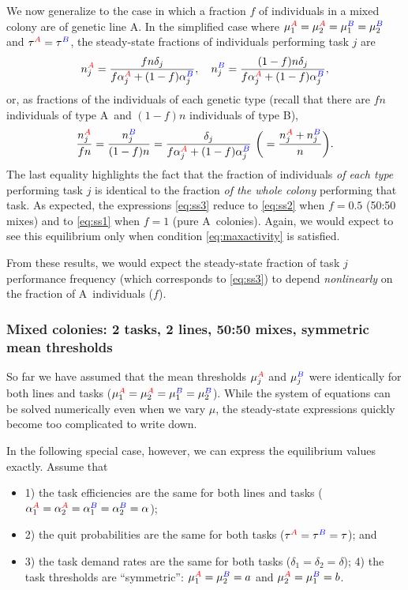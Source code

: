 \documentclass[11pt]{article}
\newcommand{\A}{{\color{red}A}}
\newcommand{\B}{{\color{blue}B}}
\begin{document}
\begin{appendices}
We now generalize to the case in which a fraction $f$ of individuals in a mixed colony are of genetic line \A. In the simplified case where $\mu_1^{\A} = \mu_2^{\A} = \mu_1^{\B} = \mu_2^{\B}$ and $\tau^{\A} = \tau^{\B}$, the steady-state fractions of individuals performing task $j$ are
\begin{equation}
     n_j^{\A} =  \frac{fn\delta_j}{f\alpha_j^{\A} + (1-f)\alpha_j^{\B}}, 
     \quad
     n_j^{\B} =  \frac{(1-f)n\delta_j}{f\alpha_j^{\A} + (1-f)\alpha_j^{\B}}, 
     \label{eq:ss3a}
\end{equation}
or, as fractions of the individuals of each genetic type (recall that there are $fn$ individuals of type \A\ and $(1-f)n$ individuals of type \B),
\begin{equation}
     \frac{n_j^{\A}}{fn} =  \frac{n_j^{\B}}{(1-f)n} = \frac{\delta_j}{f\alpha_j^{\A} + (1-f)\alpha_j^{\B}} \ \bigg(= \frac{n_j^{\A} + n_j^{\B}}{n}\bigg). \label{eq:ss3}
\end{equation}
The last equality highlights the fact that the fraction of individuals \textit{of each type} performing task $j$ is identical to the fraction \textit{of the whole colony} performing that task. As expected, the expressions \eqref{eq:ss3} reduce to \eqref{eq:ss2} when $f=0.5$ (50:50 mixes) and to \eqref{eq:ss1} when $f=1$ (pure \A\ colonies). Again, we would expect to see this equilibrium only when condition \eqref{eq:maxactivity} is satisfied. 

From these results, we would expect the steady-state fraction of task $j$ performance frequency (which corresponds to \eqref{eq:ss3}) to depend \textit{nonlinearly} on the fraction of \A\ individuals ($f$). 
\subsubsection{Mixed colonies: 2 tasks, 2 lines, 50:50 mixes, symmetric mean thresholds}

So far we have assumed that the mean thresholds $\mu_{j}^{\A}$ and $\mu_{j}^{\B}$ were identically for both lines and tasks ($\mu_{1}^{\A} = \mu_{2}^{\A} = \mu_{1}^{\B} = \mu_{2}^{\B}$). While the system of equations can be solved numerically even when we vary $\mu$, the steady-state expressions quickly become too complicated to write down.

In the following special case, however, we can express the equilibrium values exactly. Assume that 
\begin{itemize}
    \item 1) the task efficiencies are the same for both lines and tasks ($\alpha_{1}^{\A} = \alpha_{2}^{\A} = \alpha_{1}^{\B} = \alpha_{2}^{\B} = \alpha$);
    \item 2) the quit probabilities are the same for both tasks ($\tau^{\A} = \tau^{\B} = \tau$); and
    \item 3) the task demand rates are the same for both tasks ($\delta_1 = \delta_2  = \delta$); 4) the task thresholds are ``symmetric'': $\mu_{1}^{\A} = \mu_{2}^{\B} = a$ and $\mu_{2}^{\A} = \mu_{1}^{\B} = b$. 
\end{itemize}


\end{appendices}
\end{document}
